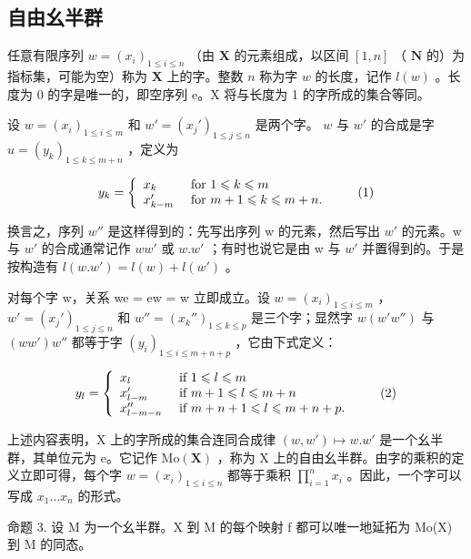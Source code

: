 \subsection{自由幺半群}

任意有限序列 \(w = (x_{i})_{1 \leqslant i \leqslant n}\) （由 \(\mathbf{X}\) 的元素组成，以区间 \([1, n]\) （ \(\mathbf{N}\) 的）为指标集，可能为空）称为 \(\mathbf{X}\) 上的字。整数 \(n\) 称为字 \(w\) 的长度，记作 \(l(w)\) 。长度为 0 的字是唯一的，即空序列 e。X 将与长度为 1 的字所成的集合等同。

设 \(w = (x_{i})_{1 \leqslant i \leqslant m}\) 和 \(w' = (x_{j}')_{1 \leqslant j \leqslant n}\) 是两个字。 \(w\) 与 \(w'\) 的合成是字 \(u = (y_{k})_{1 \leqslant k \leqslant m + n}\) ，定义为

\[
y _ {k} = \left\{ \begin{array}{l l} x _ {k} & \text { for } 1 \leqslant k \leqslant m \\ x _ {k - m} ^ {\prime} & \text { for } m + 1 \leqslant k \leqslant m + n. \end{array} \right.\tag{1}
\]

换言之，序列 \(w''\) 是这样得到的：先写出序列 w 的元素，然后写出 \(w'\) 的元素。w 与 \(w'\) 的合成通常记作 \(ww'\) 或 \(w.w'\) ；有时也说它是由 w 与 \(w'\) 并置得到的。于是按构造有 \(l(w.w') = l(w) + l(w')\) 。

对每个字 w，关系 we = ew = w 立即成立。设 \(w = (x_{i})_{1 \leqslant i \leqslant m}\) ， \(w' = (x_{j}')_{1 \leqslant j \leqslant n}\) 和 \(w'' = (x_{k}'')_{1 \leqslant k \leqslant p}\) 是三个字；显然字 \(w(w'w'')\) 与 \((ww')w''\) 都等于字 \((y_{i})_{1 \leqslant i \leqslant m+n+p}\) ，它由下式定义：

\[
y _ {l} = \left\{ \begin{array}{l l} x _ {l} & \text { if } 1 \leqslant l \leqslant m \\ x _ {l - m} ^ {\prime} & \text { if } m + 1 \leqslant l \leqslant m + n \\ x _ {l - m - n} ^ {\prime \prime} & \text { if } m + n + 1 \leqslant l \leqslant m + n + p. \end{array} \right.\tag{2}
\]

上述内容表明，X 上的字所成的集合连同合成律 \((w, w') \mapsto w.w'\) 是一个幺半群，其单位元为 e。它记作 \(\mathrm{Mo}(\mathbf{X})\) ，称为 X 上的自由幺半群。由字的乘积的定义立即可得，每个字 \(w = (x_i)_{1 \leq i \leq n}\) 都等于乘积 \(\prod_{i=1}^{n} x_i\) 。因此，一个字可以写成 \(x_1 \ldots x_{n}\) 的形式。

命题 3. 设 M 为一个幺半群。X 到 M 的每个映射 f 都可以唯一地延拓为 Mo(X) 到 M 的同态。

